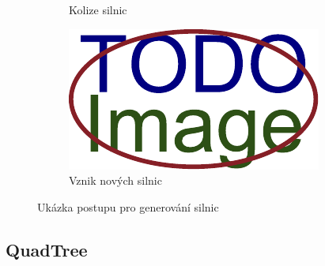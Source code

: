\begin{figure}[H]
\begin{subfigure}{0.32\textwidth}
		\caption{Kolize silnic}
		\label{fig:silnice:kolize}
	\end{subfigure}
	\hfill
	\begin{subfigure}{0.32\textwidth}
		\includegraphics[width=\textwidth]{obrazky-figures/placeholder.pdf}
		\caption{Vznik nových silnic}
		\label{fig:silnice:nové}
	\end{subfigure}
	\caption{Ukázka postupu pro generování silnic}
	\label{fig:silnice}
\end{figure}



\subsection{QuadTree}\label{ch:impl:silnice:quadtree}



